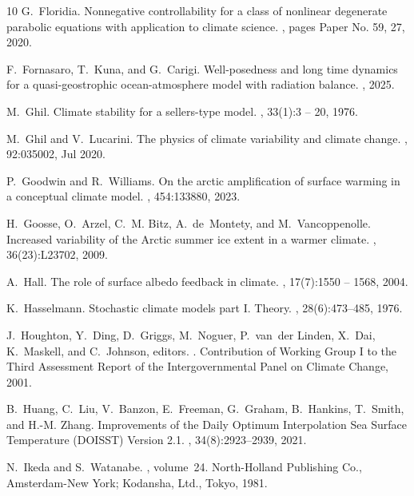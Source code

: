 \documentclass[10pt]{amsart}
\numberwithin{equation}{section}
\begin{document}
\begin{thebibliography}{10}
G.~Floridia.
\newblock Nonnegative controllability for a class of nonlinear degenerate
  parabolic equations with application to climate science.
, pages Paper No. 59, 27,
  2020.

F.~Fornasaro, T.~Kuna, and G.~Carigi.
\newblock Well-posedness and long time dynamics for a quasi-geostrophic
  ocean-atmosphere model with radiation balance.
, 2025.

M.~Ghil.
\newblock Climate stability for a sellers-type model.
, 33(1):3 -- 20, 1976.

M.~Ghil and V.~Lucarini.
\newblock The physics of climate variability and climate change.
, 92:035002, Jul 2020.

P.~Goodwin and R.~Williams.
\newblock On the arctic amplification of surface warming in a conceptual
  climate model.
, 454:133880, 2023.

H.~Goosse, O.~Arzel, C.~M. Bitz, A.~de~Montety, and M.~Vancoppenolle.
\newblock Increased variability of the {A}rctic summer ice extent in a warmer
  climate.
, 36(23):L23702, 2009.

A.~Hall.
\newblock The role of surface albedo feedback in climate.
, 17(7):1550 -- 1568, 2004.

K.~Hasselmann.
\newblock Stochastic climate models part {I}. {T}heory.
, 28(6):473--485, 1976.

J.~Houghton, Y.~Ding, D.~Griggs, M.~Noguer, P.~van~der Linden, X.~Dai,
  K.~Maskell, and C.~Johnson, editors.
.
\newblock Contribution of Working Group I to the Third Assessment Report of the
  Intergovernmental Panel on Climate Change, 2001.

B.~Huang, C.~Liu, V.~Banzon, E.~Freeman, G.~Graham, B.~Hankins, T.~Smith, and
  H.-M. Zhang.
\newblock Improvements of the {D}aily {O}ptimum {I}nterpolation {S}ea {S}urface
  {T}emperature ({DOISST}) {V}ersion 2.1.
, 34(8):2923--2939, 2021.

N.~Ikeda and S.~Watanabe.
,
  volume~24.
\newblock North-Holland Publishing Co., Amsterdam-New York; Kodansha, Ltd.,
  Tokyo, 1981.


\end{thebibliography}
\end{document}
